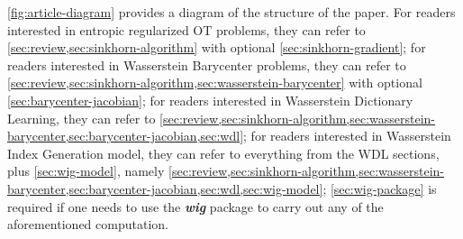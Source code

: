 \cref{fig:article-diagram} provides a diagram of the structure of the paper.
For readers interested in entropic regularized OT problems,
they can refer to \cref{sec:review,sec:sinkhorn-algorithm} with optional \cref{sec:sinkhorn-gradient};
for readers interested in Wasserstein Barycenter problems,
they can refer to \cref{sec:review,sec:sinkhorn-algorithm,sec:wasserstein-barycenter}
with optional \cref{sec:barycenter-jacobian};
for readers interested in Wasserstein Dictionary Learning,
they can refer to \cref{sec:review,sec:sinkhorn-algorithm,sec:wasserstein-barycenter,sec:barycenter-jacobian,sec:wdl};
for readers interested in Wasserstein Index Generation model,
they can refer to everything from the WDL sections, plus \cref{sec:wig-model},
namely \cref{sec:review,sec:sinkhorn-algorithm,sec:wasserstein-barycenter,sec:barycenter-jacobian,sec:wdl,sec:wig-model};
\cref{sec:wig-package} is required if one needs to use the \textbf{\textit{wig}} package to carry out
any of the aforementioned computation.
